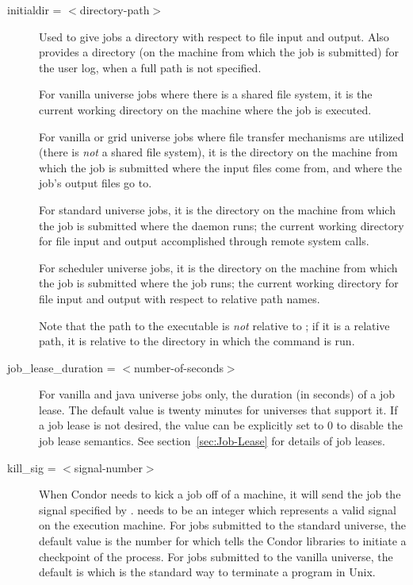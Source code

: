 \begin{description}

\item[initialdir = $<$directory-path$>$] 
Used to give jobs a directory with respect to file input and output.
Also provides a directory 
(on the machine from which the job is submitted)
for the user log, when a full path is not specified. 

For vanilla universe jobs where there is a shared file system,
it is the current working directory on the machine where the
job is executed.

For vanilla or grid universe jobs where file transfer mechanisms are
utilized (there is \emph{not} a shared file system),
it is the directory on the machine from which the job is submitted
where the input files come from, and where the job's output
files go to.

For standard universe jobs,
it is the directory on the machine from which the job is submitted
where the  daemon runs;
the current working directory for file input and output accomplished
through remote system calls.

For scheduler universe jobs,
it is the directory on the machine from which the job is submitted
where the job runs;
the current working directory for file input and output with
respect to relative path names.

Note that the path to the executable is \emph{not} relative to
; if it is a relative path, it is relative to the
directory in which the  command is run.


\item[job\_lease\_duration = $<$number-of-seconds$>$] For vanilla
and java universe jobs only, the duration (in seconds) of a
job lease.
The default value is twenty minutes for universes that support it.
If a job lease is not desired, the value can be explicitly set to 0 to
disable the job lease semantics.
See section~\ref{sec:Job-Lease} for details of job leases.



\item[kill\_sig = $<$signal-number$>$] When Condor needs to kick a job
off of a machine, it will send the job the signal specified by
.   needs to be an integer which
represents a valid signal on the execution machine.  For jobs submitted
to the standard universe, the default value is the number for
\verb@SIGTSTP@ which tells the Condor libraries to initiate a checkpoint
of the process.  For jobs submitted to the vanilla universe,
the default 
is \verb@SIGTERM@ which is the standard way to terminate a program in Unix.  


\end{description}
